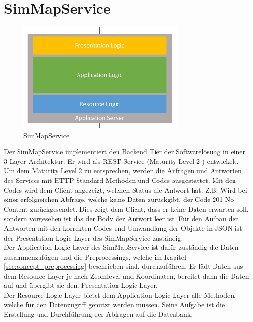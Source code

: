 \section{SimMapService}
\begin{figure}[H]
\centering
\includegraphics[height=5.5cm]{images/BusinessLogicLayer.png}
\caption{SimMapService}
\label{fig:businesslogiclayer}
\end{figure}
\noindent
Der SimMapService implementiert den Backend Tier der Softwarelösung in einer 3 Layer Architektur. Er wird als REST Service (Maturity Level 2 \cite{RESTMaturity} ) entwickelt. Um dem Maturity Level 2 zu entsprechen, werden die Anfragen und Antworten des Services mit HTTP Standard Methoden und Codes ausgestattet. Mit den Codes wird dem Client angezeigt, welchen Status die Antwort hat. Z.B. Wird bei einer erfolgreichen Abfrage, welche keine Daten zurückgibt, der Code 201 No Content zurückgesendet. Dies zeigt dem Client, dass er keine Daten erwarten soll, sondern vorgesehen ist das der Body der Antwort leer ist. Für den Aufbau der Antworten mit den korrekten Codes und Umwandlung der Objekte in JSON ist der Presentation Logic Layer des SimMapService zuständig.\\
Der Application Logic Layer des SimMapService ist dafür zuständig die Daten zusammenzufügen und die Preprocessings, welche im Kapitel \ref{sec:concept_preprocessing}  beschrieben sind, durchzuführen. Er lädt Daten aus dem Resource Layer je nach Zoomlevel und Koordinaten, bereitet dann die Daten auf und übergibt sie dem Presentation Logic Layer.\\
Der Resource Logic Layer bietet dem Application Logic Layer alle Methoden, welche für den Datenzugriff genutzt werden müssen. Seine Aufgabe ist die Erstellung und Durchführung der Abfragen auf die Datenbank.
